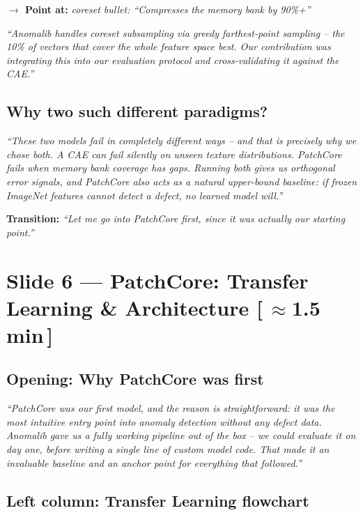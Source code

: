 \documentclass[12pt, a4paper]{article}
\newcommand{\say}[1]{%
  \begin{mdframed}[style=saybox]
  \itshape ``#1''
  \end{mdframed}
}
\newcommand{\timing}[1]{\hfill{\small\color{muted}[\,\textbf{#1}\,]}}
\newcommand{\pointer}[1]{\noindent\textbf{\color{teal}$\rightarrow$ Point at:} \textit{#1}\\[2pt]}
\newcommand{\transition}[1]{\vspace{4pt}\noindent\textbf{\color{accent}Transition:} \textit{``#1''}\vspace{4pt}}
\begin{document}
\pointer{coreset bullet: ``Compresses the memory bank by 90\%+''}

\say{Anomalib handles coreset subsampling via greedy farthest-point sampling -- the 10\% of vectors that cover the whole feature space best. Our contribution was integrating this into our evaluation protocol and cross-validating it against the CAE.}

\subsection{Why two such different paradigms?}

\say{These two models fail in completely different ways -- and that is precisely why we chose both. A CAE can fail silently on unseen texture distributions. PatchCore fails when memory bank coverage has gaps. Running both gives us orthogonal error signals, and PatchCore also acts as a natural upper-bound baseline: if frozen ImageNet features cannot detect a defect, no learned model will.}

\transition{Let me go into PatchCore first, since it was actually our starting point.}

\vspace{1em}

\section{Slide 6 --- PatchCore: Transfer Learning \& Architecture \timing{$\approx$1.5 min}}

\subsection{Opening: Why PatchCore was first}

\say{PatchCore was our first model, and the reason is straightforward: it was the most intuitive entry point into anomaly detection without any defect data. Anomalib gave us a fully working pipeline out of the box -- we could evaluate it on day one, before writing a single line of custom model code. That made it an invaluable baseline and an anchor point for everything that followed.}

\subsection{Left column: Transfer Learning flowchart}
\end{document}
